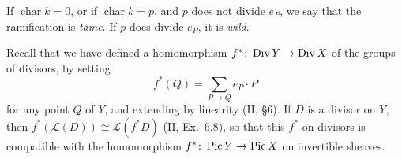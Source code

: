 
If $\operatorname{char} k = 0$, or if $\operatorname{char} k = p$, and $p$
does not divide $e_P$, we say that the ramification is \emph{tame}. If $p$
does divide $e_P$, it is \emph{wild}.

Recall that we have defined a homomorphism
$f^*\colon \operatorname{Div} Y \to \operatorname{Div} X$ of the groups of divisors, by setting
\[
  f^*(Q) = \sum_{P \to Q} e_P \cdot P
\]
for any point $Q$ of $Y$, and extending by linearity (II, \S 6). If $D$ is a
divisor on $Y$, then $f^*(\mathscr{L}(D)) \cong \mathscr{L}(f^*D)$
(II, Ex.\ 6.8), so that this $f^*$ on divisors is compatible with the
homomorphism $f^*\colon \operatorname{Pic} Y \to \operatorname{Pic} X$ on invertible sheaves.
